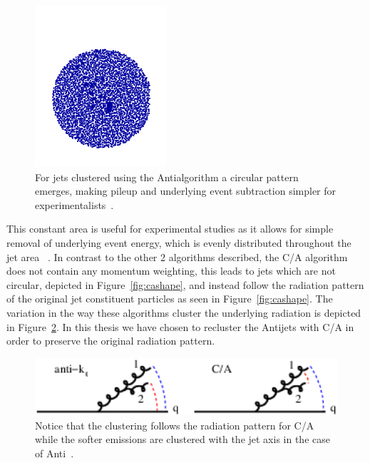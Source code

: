 \begin{figure}[htb]
\centering
\includegraphics[width=.40\textwidth]{visuals/figs_subjet-plots-antikt.png}
\caption{For jets clustered using the Anti\kt algorithm a circular pattern emerges, making pileup and underlying event subtraction simpler for experimentalists~\cite{Dreyer:2018nbf}.}
\label{fig:antikt}
\end{figure}



This constant area is useful for experimental studies as it allows for simple removal of underlying event energy, which is evenly distributed throughout the jet area ~\cite{Dreyer:2018nbf}. In contrast to the other 2 algorithms described, the C/A algorithm does not contain any momentum weighting, this leads to jets which are not circular, depicted in Figure~\ref{fig:cashape}, and instead follow the radiation pattern of the original jet constituent particles as seen in Figure~\ref{fig:cashape}. The variation in the way these algorithms cluster the underlying radiation is depicted in Figure~\ref{fig:algclusterdiffs}. In this thesis we have chosen to recluster the Anti\kt jets with C/A in order to preserve the original radiation pattern.


\begin{figure}[htb]
\centering
\includegraphics[width=1.0\textwidth]{visuals/config-antikt-double-lund.png}
\caption{Notice that the clustering follows the radiation pattern for C/A while the softer emissions are clustered with the jet axis in the case of Anti\kt ~\cite{Dreyer:2018nbf}.}
\label{fig:algclusterdiffs}
\end{figure}


